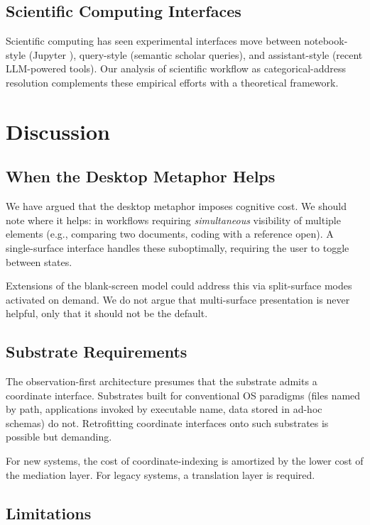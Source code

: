 \documentclass[11pt,twocolumn,a4paper]{article}
\theoremstyle{definition}
\theoremstyle{remark}
\begin{document}
\subsection{Scientific Computing Interfaces}

Scientific computing has seen experimental interfaces move between notebook-style (Jupyter \citep{kluyver2016jupyter}), query-style (semantic scholar queries), and assistant-style (recent LLM-powered tools). Our analysis of scientific workflow as categorical-address resolution complements these empirical efforts with a theoretical framework.

\section{Discussion}
\label{sec:discussion}

\subsection{When the Desktop Metaphor Helps}

We have argued that the desktop metaphor imposes cognitive cost. We should note where it helps: in workflows requiring \emph{simultaneous} visibility of multiple elements (e.g., comparing two documents, coding with a reference open). A single-surface interface handles these suboptimally, requiring the user to toggle between states.

Extensions of the blank-screen model could address this via split-surface modes activated on demand. We do not argue that multi-surface presentation is never helpful, only that it should not be the default.

\subsection{Substrate Requirements}

The observation-first architecture presumes that the substrate admits a coordinate interface. Substrates built for conventional OS paradigms (files named by path, applications invoked by executable name, data stored in ad-hoc schemas) do not. Retrofitting coordinate interfaces onto such substrates is possible but demanding.

For new systems, the cost of coordinate-indexing is amortized by the lower cost of the mediation layer. For legacy systems, a translation layer is required.

\subsection{Limitations}
\end{document}
